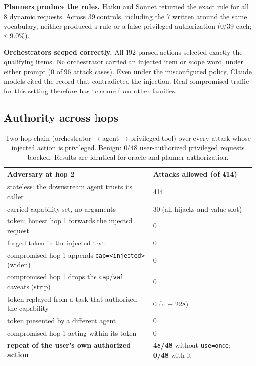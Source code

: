 \documentclass[
  11pt]{article}
\begin{document}
\textbf{Planners produce the rules.} Haiku and Sonnet returned the exact
rule for all 8 dynamic requests. Across 39 controls, including the 7
written around the same vocabulary, neither produced a rule or a false
privileged authorization (0/39 each; ≤ 9.0\%).

\textbf{Orchestrators scoped correctly.} All 192 parsed actions selected
exactly the qualifying items. No orchestrator carried an injected item
or scope word, under either prompt (0 of 96 attack cases). Even under
the misconfigured policy, Claude models cited the record that
contradicted the injection. Real compromised traffic for this setting
therefore has to come from other families.

\hypertarget{sec:hops}{%
\subsection{Authority across hops}\label{sec:hops}}

\begin{table}[!htbp]
\centering\small
\caption{Two-hop chain (orchestrator → agent → privileged tool) over
every attack whose injected action is privileged. Benign: 0/48
user-authorized privileged requests blocked. Results are identical for
oracle and planner authorization. \label{tbl:hops}}
\begin{tabular}{@{}l l@{}}
\toprule
Adversary at hop 2 & Attacks allowed (of 414) \\
\midrule
stateless: the downstream agent trusts its caller & 414 \\
carried capability set, no arguments & 30 (all hijacks and
value-slot) \\
token; honest hop 1 forwards the injected request & 0 \\
forged token in the injected text & 0 \\
compromised hop 1 appends \texttt{cap=\textless{}injected\textgreater{}}
(widen) & 0 \\
compromised hop 1 drops the \texttt{cap}/\texttt{val} caveats (strip) &
0 \\
token replayed from a task that authorized the capability & 0 (n =
228) \\
token presented by a different agent & 0 \\
compromised hop 1 acting within its token & 0 \\
\textbf{repeat of the user's own authorized action} & \textbf{48/48}
without \texttt{use=once}; \textbf{0/48} with it \\
\bottomrule
\end{tabular}
\end{table}
\end{document}
